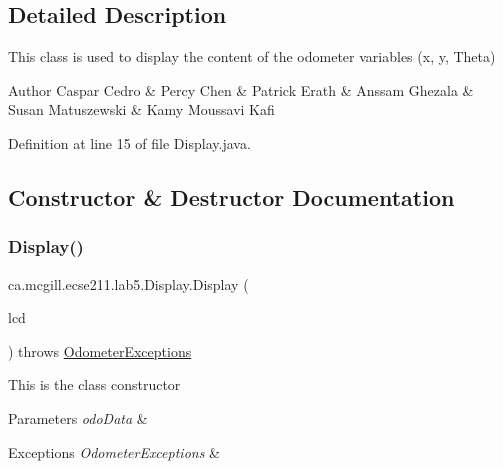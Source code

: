 \subsection{Detailed Description}
This class is used to display the content of the odometer variables (x, y, Theta)

\begin{DoxyAuthor}{Author}
Caspar Cedro \& Percy Chen \& Patrick Erath \& Anssam Ghezala \& Susan Matuszewski \& Kamy Moussavi Kafi 
\end{DoxyAuthor}


Definition at line 15 of file Display.\+java.



\subsection{Constructor \& Destructor Documentation}
\mbox{\label{classca_1_1mcgill_1_1ecse211_1_1lab5_1_1_display_aeb15906f02c60c1ca449d4c37922739b}} 
\subsubsection{\texorpdfstring{Display()}{Display()}\hspace{0.1cm}{\footnotesize\ttfamily [1/2]}}
{\footnotesize\ttfamily ca.\+mcgill.\+ecse211.\+lab5.\+Display.\+Display (\begin{DoxyParamCaption}\item[{Text\+L\+CD}]{lcd }\end{DoxyParamCaption}) throws \hyperlink{classca_1_1mcgill_1_1ecse211_1_1odometer_1_1_odometer_exceptions}{Odometer\+Exceptions}}

This is the class constructor


\begin{DoxyParams}{Parameters}
{\em odo\+Data} & \\
\hline
\end{DoxyParams}

\begin{DoxyExceptions}{Exceptions}
{\em Odometer\+Exceptions} & \\
\hline
\end{DoxyExceptions}


